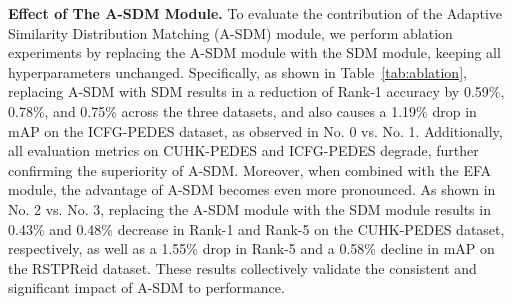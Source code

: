 \documentclass[acmsmall]{acmart}
\begin{document}
{\bfseries Effect of The A-SDM Module.} To evaluate the contribution
of the Adaptive Similarity Distribution Matching (A-SDM) module, we
perform ablation experiments by replacing the A-SDM module with the
SDM module, keeping all hyperparameters unchanged. Specifically, as
shown in Table~\ref{tab:ablation}, replacing A-SDM with SDM results
in a reduction of Rank-1 accuracy by 0.59\%, 0.78\%, and 0.75\%
across the three datasets, and also causes a 1.19\% drop in mAP on
the ICFG-PEDES dataset, as observed in No. 0 vs. No. 1.
Additionally, all evaluation metrics on CUHK-PEDES and ICFG-PEDES
degrade, further confirming the superiority of A-SDM. Moreover, when
combined with the EFA module, the advantage of A-SDM becomes even
more pronounced. As shown in No. 2 vs. No. 3, replacing the A-SDM
module with the SDM module results in 0.43\% and 0.48\% decrease in
Rank-1 and Rank-5 on the CUHK-PEDES dataset, respectively, as well
as a 1.55\% drop in Rank-5 and a 0.58\% decline in mAP on the
RSTPReid dataset. These results collectively validate the consistent
and significant impact of A-SDM to performance.

\begin{table} \footnotesize
    \centering
    \caption{Ablation analysis of FMFA modules across three public benchmarks.}
    \label{tab:ablation}
\end{table}
\end{document}
